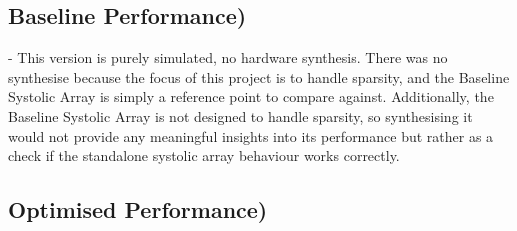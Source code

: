 \documentclass[12pt, a4paper, ukenglish]{article}
\begin{document}
    
    \subsection{Baseline Performance)} \label{sec: perform base}
    - This version is purely simulated, no hardware synthesis. There was no synthesise because the focus of this project is to handle sparsity, and the Baseline Systolic Array is simply a reference point to compare against. Additionally, the Baseline Systolic Array is not designed to handle sparsity, so synthesising it would not provide any meaningful insights into its performance but rather as a check if the standalone systolic array behaviour works correctly.

    
    
    \subsection{Optimised Performance)} \label{sec: perform optimised}
    
    
\end{document}
